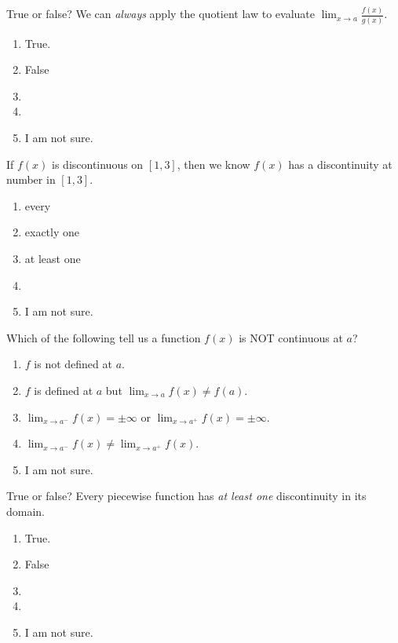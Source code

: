 \documentclass[14pt]{beamer}
\begin{document}
\begin{frame}
  True or false? We can \emph{always} apply the quotient law to evaluate \(\lim_{x \to a} \frac{f(x)}{g(x)}\).

  \medskip
  \begin{enumerate} 
    \item True.
    \item False
    \item 
    \item 
    \item I am not sure.
  \end{enumerate} 
\end{frame}


\begin{frame}
  If \(f(x)\) is discontinuous on \([1,3]\), then we know \(f(x)\) has a discontinuity at \underline{\hspace{1in}} number in \([1,3]\). 
  \medskip
  \begin{enumerate} 
    \item every
    \item exactly one
    \item at least one
    \item 
    \item I am not sure.
  \end{enumerate} 

\end{frame} 


\begin{frame}
  Which of the following tell us a function \(f(x)\) is NOT continuous at \(a\)?
  \medskip
  \begin{enumerate} 
    \item \(f\) is not defined at \(a\).
    \item \(f\) is defined at \(a\) but \(\lim_{x \to a} f(x) \ne f(a)\).
    \item \(\lim_{x \to a^{-}} f(x) = \pm \infty\) or \(\lim_{x \to a^{+}} f(x) = \pm \infty\).
    \item \(\lim_{x \to a^{-}} f(x) \ne \lim_{x \to a^{+}} f(x)\).
    \item I am not sure.
  \end{enumerate} 
\end{frame}


\begin{frame}
  True or false? Every piecewise function has \emph{at least one} discontinuity in its domain.

  \medskip
  \begin{enumerate} 
    \item True.
    \item False
    \item 
    \item 
    \item I am not sure.
  \end{enumerate} 
\end{frame} 
\end{document}
